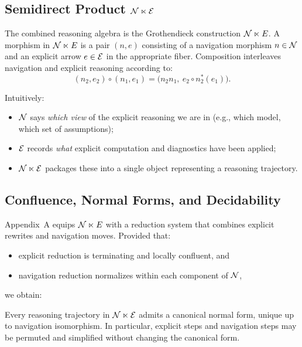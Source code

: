 \subsection{Semidirect Product \texorpdfstring{\(\mathcal{N} \ltimes \mathcal{E}\)}{N ⋉ E}}

The combined reasoning algebra is the Grothendieck construction
\(\mathcal{N} \ltimes E\). A morphism in \(\mathcal{N} \ltimes E\) is a pair
\((n,e)\) consisting of a navigation morphism \(n\in\mathcal{N}\) and an
explicit arrow \(e\in\mathcal{E}\) in the appropriate fiber. Composition
interleaves navigation and explicit reasoning according to:
\[
(n_2,e_2)\circ(n_1,e_1)
 =
\bigl(n_2n_1,\ e_2\circ n_2^\ast(e_1)\bigr).
\]

Intuitively:
\begin{itemize}[leftmargin=2em]
  \item \(\mathcal{N}\) says \emph{which view} of the explicit reasoning we
        are in (e.g., which model, which set of assumptions);
  \item \(\mathcal{E}\) records \emph{what} explicit computation and
        diagnostics have been applied;
  \item \(\mathcal{N} \ltimes \mathcal{E}\) packages these into a single object
        representing a reasoning trajectory.
\end{itemize}

\subsection{Confluence, Normal Forms, and Decidability}

Appendix~A equips \(\mathcal{N} \ltimes E\) with a reduction system that
combines explicit rewrites and navigation moves. Provided that:
\begin{itemize}[leftmargin=2em]
  \item explicit reduction is terminating and locally confluent, and
  \item navigation reduction normalizes within each component of
        \(\mathcal{N}\),
\end{itemize}
we obtain:

\begin{theorem}
Every reasoning trajectory in \(\mathcal{N} \ltimes \mathcal{E}\) admits a
canonical normal form, unique up to navigation isomorphism. In
particular, explicit steps and navigation steps may be permuted and
simplified without changing the canonical form.
\end{theorem}

